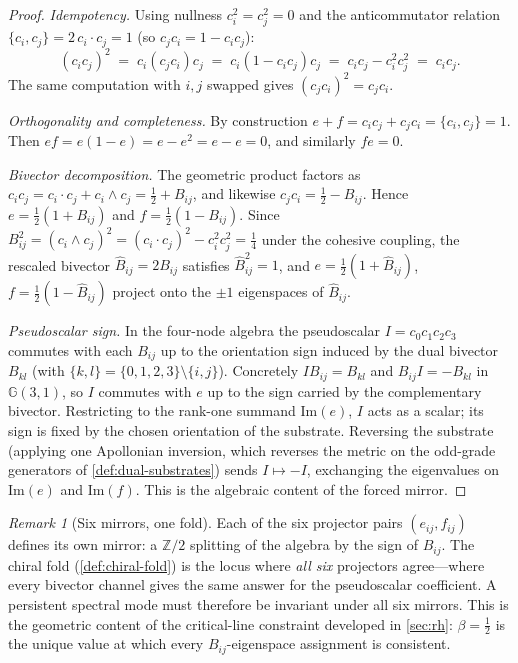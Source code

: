 \documentclass[11pt,a4paper]{article}
\theoremstyle{plain}
\theoremstyle{definition}
\theoremstyle{remark}
\newtheorem{remark}[theorem]{Remark}
\numberwithin{equation}{section}
\newcommand{\Cl}{\mathbb{G}}
\begin{document}
\begin{proof}
\emph{Idempotency.}  Using nullness \(c_i^2=c_j^2=0\) and the
anticommutator relation \(\{c_i,c_j\}=2\,c_i\cdot c_j=1\) (so
\(c_jc_i=1-c_ic_j\)):
\[
  (c_ic_j)^2 \;=\; c_i(c_jc_i)c_j \;=\; c_i(1-c_ic_j)c_j
  \;=\; c_ic_j - c_i^2 c_j^2 \;=\; c_ic_j.
\]
The same computation with \(i,j\) swapped gives \((c_jc_i)^2=c_jc_i\).

\emph{Orthogonality and completeness.}  By construction
\(e+f=c_ic_j+c_jc_i=\{c_i,c_j\}=1\).  Then
\(ef=e(1-e)=e-e^2=e-e=0\), and similarly \(fe=0\).

\emph{Bivector decomposition.}  The geometric product factors as
\(c_ic_j=c_i\cdot c_j+c_i\wedge c_j=\tfrac12+B_{ij}\), and likewise
\(c_jc_i=\tfrac12-B_{ij}\).  Hence \(e=\tfrac12(1+B_{ij})\) and
\(f=\tfrac12(1-B_{ij})\).  Since \(B_{ij}^2=(c_i\wedge c_j)^2
=(c_i\cdot c_j)^2-c_i^2 c_j^2=\tfrac14\) under the cohesive coupling,
the rescaled bivector \(\hat B_{ij}=2B_{ij}\) satisfies
\(\hat B_{ij}^2=1\), and \(e=\tfrac12(1+\hat B_{ij})\),
\(f=\tfrac12(1-\hat B_{ij})\) project onto the \(\pm1\) eigenspaces of
\(\hat B_{ij}\).

\emph{Pseudoscalar sign.}  In the four-node algebra the pseudoscalar
\(I=c_0c_1c_2c_3\) commutes with each \(B_{ij}\) up to the orientation
sign induced by the dual bivector \(B_{kl}\) (with \(\{k,l\}=\{0,1,2,3\}
\setminus\{i,j\}\)).  Concretely \(IB_{ij}=B_{kl}\) and \(B_{ij}I=-B_{kl}\)
in \(\Cl(3,1)\), so \(I\) commutes with \(e\) up to the sign carried by
the complementary bivector.  Restricting to the rank-one summand
\(\mathrm{Im}(e)\), \(I\) acts as a scalar; its sign is fixed by the
chosen orientation of the substrate.  Reversing the substrate
(applying one Apollonian inversion, which reverses the metric on the
odd-grade generators of \cref{def:dual-substrates}) sends
\(I\mapsto-I\), exchanging the eigenvalues on \(\mathrm{Im}(e)\) and
\(\mathrm{Im}(f)\).  This is the algebraic content of the forced mirror.
\end{proof}

\begin{remark}[Six mirrors, one fold]
\label{rmk:six-mirrors-one-fold}
Each of the six projector pairs \((e_{ij},f_{ij})\) defines its own
mirror: a \(\mathbb{Z}/2\) splitting of the algebra by the sign of
\(B_{ij}\).  The chiral fold (\cref{def:chiral-fold}) is the locus
where \emph{all six} projectors agree---where every bivector channel
gives the same answer for the pseudoscalar coefficient.  A persistent
spectral mode must therefore be invariant under all six mirrors.  This
is the geometric content of the critical-line constraint developed in
\cref{sec:rh}: \(\beta=\tfrac12\) is the unique value at which
every \(B_{ij}\)-eigenspace assignment is consistent.
\end{remark}
\end{document}
